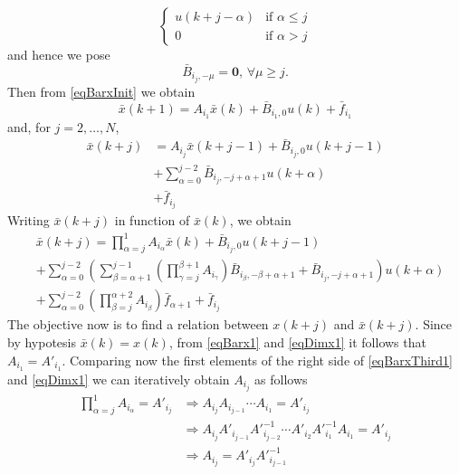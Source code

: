\documentclass[]{ifacconf}  %
\begin{document}
\begin{pf}
\begin{equation}
\begin{cases}
	u(k+j-\alpha) &\mbox{if } \alpha \leq j\\
	0             &\mbox{if } \alpha > j
	\end{cases}
	\end{equation}	
	\normalsize
	and hence we pose
	\small
	\begin{equation}\label{eqBarBij0}
	\bar B_{i_j,-\mu} = \mathbf{0},\,\forall\mu\geq j.
	\end{equation}
	\normalsize
	Then from \eqref{eqBarxInit} we obtain
	\small
	\begin{equation}\label{eqBarx1}
	\bar x(k+1) = A_{i_1}\bar x(k) + \bar B_{i_1,0}u(k) + \bar f_{i_1}
	\end{equation}
	\normalsize
	and, for $j=2,\ldots,N$,
	\small
	\begin{align}\label{eqBarxSecond}
	\bar x(k+j) &= A_{i_j}\bar x(k+j-1) + \bar B_{i_j,0}u(k+j-1)  \\
	&+ \sum_{\alpha=0}^{j-2}\bar B_{i_j,-j+\alpha+1}u(k+\alpha) \\
	&+ \bar f_{i_j}
	\end{align}
	\normalsize
	Writing $\bar x(k+j)$ in function of $\bar x(k)$, we obtain
	\small
	\begin{align}
	&\bar x(k+j) = \prod_{\alpha=j}^{1}{A_{i_\alpha}}\bar x(k) + \bar B_{i_j,0}u(k+j-1)\label{eqBarxThird1}\\
	&+ \sum_{\alpha=0}^{j-2}{\left(\sum_{\beta=\alpha+1}^{j-1}{\left(\prod_{\gamma=j}^{\beta+1}{A_{i_\gamma}}\right)\bar B_{i_{\beta},-\beta+\alpha+1} + \bar B_{i_j,-j+\alpha+1}}\right)u(k+\alpha)}\label{eqBarxThird2}	\\	
	&+ \sum_{\alpha=0}^{j-2}{\left(\prod_{\beta=j}^{\alpha + 2}{A_{i_\beta}}\right)\bar f_{\alpha+1}} + \bar f_{i_j}\label{eqBarxThird3}		
	\end{align}
	\normalsize
	The objective now is to find a relation between $x(k+j)$ and $\bar x(k+j)$. Since by hypotesis $\bar x(k)=x(k)$, from \eqref{eqBarx1} and \eqref{eqDimx1} it follows that $A_{i_1}=A'_{i_1}$. Comparing now the first elements of the right side of \eqref{eqBarxThird1} and \eqref{eqDimx1} we can iteratively obtain $A_{i_j}$ as follows
	\small
	\begin{align}\label{eqAij}
	\nonumber\prod_{\alpha=j}^{1}{A_{i_\alpha}}=A'_{i_j}&\Rightarrow A_{i_j}A_{i_{j-1}}\cdots A_{i_1}=A'_{i_j}\\
	\nonumber&\Rightarrow A_{i_j}A'_{i_{j-1}}A'^{-1}_{i_{j-2}}\cdots A'_{i_2}A'^{-1}_{i_1}A_{i_1}=A'_{i_j}\\
	&\Rightarrow A_{i_j}=A'_{i_j}A'^{-1}_{i_{j-1}}

\end{align}
\end{pf}
\end{document}
